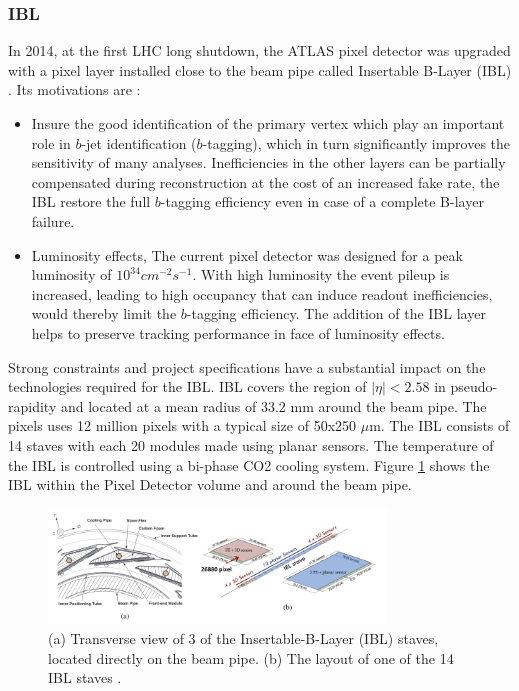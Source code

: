 \subsubsection{IBL}
\label{chap2:ATLAS:ITK:IBL}
In 2014, at the first LHC long shutdown, the ATLAS pixel detector was upgraded with a pixel layer installed close to the beam pipe called Insertable B-Layer (IBL) \cite{IBL_TDR}. Its motivations are :
\begin{itemize}
	\item Insure the good identification of the primary vertex which play an important role in $b$-jet identification ($b$-tagging), which in turn significantly improves the sensitivity of many analyses. Inefficiencies in the other layers can be partially compensated during reconstruction at the cost of an increased fake rate, the IBL restore the full $b$-tagging efficiency even in case of a complete B-layer failure.
	\item Luminosity effects, The current pixel detector was designed for a peak luminosity of $10^{34} cm^{-2}s^{-1}$. With high luminosity the event pileup is increased, leading to high occupancy that can induce readout inefficiencies, would thereby limit the $b$-tagging efficiency. The addition of the IBL layer helps to preserve tracking performance in face of luminosity effects.
\end{itemize}
Strong constraints and project specifications have a substantial impact on the technologies required for the IBL. IBL covers the region of $|\eta|< 2.58$ in pseudo-rapidity and located at a mean radius of 33.2 mm around the beam pipe. The pixels uses 12 million pixels with a typical size of 50x250 $\mu$m. The IBL consists of 14 staves with each 20 modules made using planar sensors. The temperature of the IBL is controlled using a bi-phase CO2 cooling system. Figure \ref{fig:chap2:ATLAS:ITK:IBL} shows the IBL within the Pixel Detector volume and around the beam pipe.
\begin{figure}[htbp]
    \centering
    \includegraphics[width=0.8\textwidth]{Ch2/Img/IBL.png}
    \caption{(a) Transverse view of 3 of the Insertable-B-Layer (IBL) staves, located directly on the beam pipe. (b) The layout of one of the 14 IBL staves \cite{ID_withIBL}.}
    \label{fig:chap2:ATLAS:ITK:IBL}
\end{figure}


